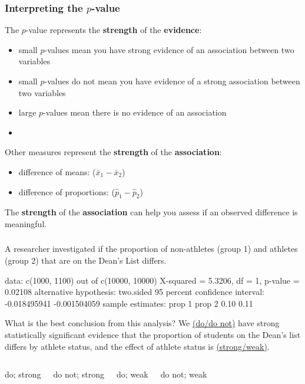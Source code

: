 \begin{frame}
\frametitle{Interpreting the $p$-value}
The $p$-value represents the \textbf{strength} of the \textbf{evidence}:\\
\begin{itemize}
    \item
    small $p$-values mean you have strong evidence of an association between two variables
    \item
    small $p$-values do not mean you have evidence of a strong association between two variables
    \item
    large $p$-values mean there is no evidence of an association
    \item[]
\end{itemize}
Other measures represent the \textbf{strength} of the \textbf{association}:\\
\begin{itemize}
    \item
    difference of means: ($\bar{x}_1-\bar{x}_2$)
    \item
    difference of proportions: ($\hat{p}_1-\hat{p}_2$)
\end{itemize}
The \textbf{strength} of the \textbf{association} can help you assess if an observed difference is meaningful.
\end{frame}


\begin{frame}[fragile]
\frametitle{\grp}
\small{A researcher investigated if the proportion of non-athletes (group 1) and athletes (group 2) that are on the Dean's List differs.}
\begin{lcverbatim}
data:  c(1000, 1100) out of c(10000, 10000)
X-squared = 5.3206, df = 1, p-value = 0.02108
alternative hypothesis: two.sided
95 percent confidence interval:
 -0.018495941 -0.001504059
sample estimates:
prop 1 prop 2
  0.10   0.11
\end{lcverbatim}
\begin{clicker}{\small{What is the best conclusion from this analysis?  We \underline{(do/do not)} have strong statistically significant evidence that the proportion of students on the Dean's list differs by athlete status, and the effect of athlete status is \underline{(strong/weak)}.}}
\begin{enumerate}
\vspace*{-12pt}
\begin{columns}
    \item
    do; strong
    \item
    do not; strong
    \item
    do; weak
    \item
    do not; weak
\end{columns}
\end{enumerate}
\end{clicker}
\end{frame}

